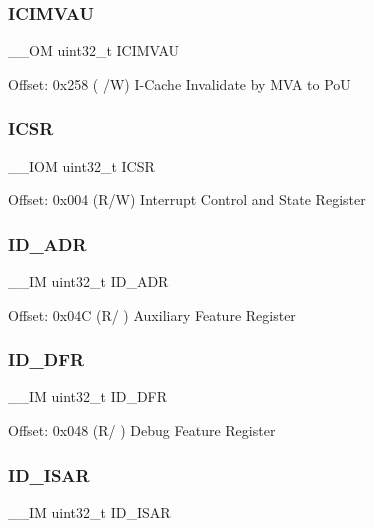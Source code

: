 \subsubsection{\texorpdfstring{ICIMVAU}{ICIMVAU}}
{\footnotesize\ttfamily \+\_\+\+\_\+\+OM uint32\+\_\+t I\+C\+I\+M\+V\+AU}

Offset\+: 0x258 ( /W) I-\/\+Cache Invalidate by M\+VA to PoU \mbox{\label{struct_s_c_b___type_aced895d6aba03d72b0d865fcc5ce44ee}} 
\subsubsection{\texorpdfstring{ICSR}{ICSR}}
{\footnotesize\ttfamily \+\_\+\+\_\+\+I\+OM uint32\+\_\+t I\+C\+SR}

Offset\+: 0x004 (R/W) Interrupt Control and State Register \mbox{\label{struct_s_c_b___type_a394a63fd0c3f9d7a52d7b220e31a2ef4}} 
\subsubsection{\texorpdfstring{ID\_ADR}{ID\_ADR}}
{\footnotesize\ttfamily \+\_\+\+\_\+\+IM uint32\+\_\+t I\+D\+\_\+\+A\+DR}

Offset\+: 0x04C (R/ ) Auxiliary Feature Register \mbox{\label{struct_s_c_b___type_a883f7e28417c51d3a3bf03185baf448f}} 
\subsubsection{\texorpdfstring{ID\_DFR}{ID\_DFR}}
{\footnotesize\ttfamily \+\_\+\+\_\+\+IM uint32\+\_\+t I\+D\+\_\+\+D\+FR}

Offset\+: 0x048 (R/ ) Debug Feature Register \mbox{\label{struct_s_c_b___type_ae6615f4da8c7691bf3b474f70f29a43c}} 
\subsubsection{\texorpdfstring{ID\_ISAR}{ID\_ISAR}}
{\footnotesize\ttfamily \+\_\+\+\_\+\+IM uint32\+\_\+t I\+D\+\_\+\+I\+S\+AR}

